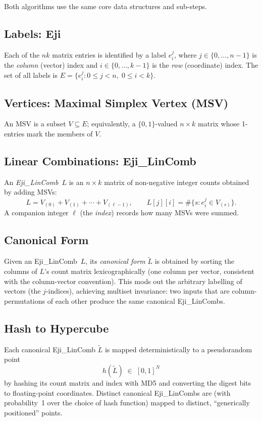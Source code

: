 \documentclass[11pt,a4paper]{article}
\newcommand{\eji}[2]{e^{#1}_{#2}}           %
\newcommand{\hash}[1]{h\!\left(#1\right)}   %
\newcommand{\canon}[1]{\widetilde{#1}}      %
\begin{document}
Both algorithms use the same core data structures and sub-steps.

\subsection*{Labels: Eji}
Each of the $nk$ matrix entries is identified by a label $\eji{j}{i}$, where
$j \in \{0,\ldots,n{-}1\}$ is the \emph{column} (vector) index and
$i \in \{0,\ldots,k{-}1\}$ is the \emph{row} (coordinate) index.
The set of all labels is $E = \{\eji{j}{i} : 0 \le j < n,\; 0 \le i < k\}$.

\subsection*{Vertices: Maximal Simplex Vertex (MSV)}
An MSV is a subset $V \subseteq E$; equivalently, a $\{0,1\}$-valued $n{\times}k$
matrix whose 1-entries mark the members of $V$.

\subsection*{Linear Combinations: Eji\_LinComb}
An \emph{Eji\_LinComb}~$L$ is an $n{\times}k$ matrix of non-negative integer
counts obtained by adding MSVs:
\[
  L = V_{(0)} + V_{(1)} + \cdots + V_{(\ell-1)},
  \qquad L[j][i] = \#\bigl\{s : \eji{j}{i} \in V_{(s)}\bigr\}.
\]
A companion integer $\ell$ (the \emph{index}) records how many MSVs were summed.

\subsection*{Canonical Form}
\label{sec:canonical}
Given an Eji\_LinComb~$L$, its \emph{canonical form} $\canon{L}$ is obtained
by sorting the columns of $L$'s count matrix lexicographically (one column per
vector, consistent with the column-vector convention).  This mods out the
arbitrary labelling of vectors (the $j$-indices), achieving multiset invariance:
two inputs that are column-permutations of each other produce the same canonical
Eji\_LinCombs.

\subsection*{Hash to Hypercube}
\label{sec:hash}
Each canonical Eji\_LinComb $\canon{L}$ is mapped deterministically to a
pseudorandom point
\[
  \hash{\canon{L}} \;\in\; [0,1]^N
\]
by hashing its count matrix and index with MD5 and converting the digest bits
to floating-point coordinates.  Distinct canonical Eji\_LinCombs are (with
probability~1 over the choice of hash function) mapped to distinct,
``generically positioned'' points.
\end{document}
